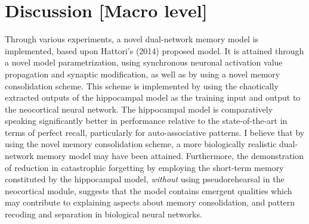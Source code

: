 
\chapter{Discussion [Macro level]}\label{chpt:discussion}


Through various experiments, a novel dual-network memory model is implemented, based upon Hattori's (2014) proposed model. It is attained through a novel model parametrization, using synchronous neuronal activation value propagation and synaptic modification, as well as by using a novel memory consolidation scheme. This scheme is implemented by using the chaotically extracted outputs of the hippocampal model as the training input and output to the neocortical neural network. The hippocampal model is comparatively speaking significantly better in performance relative to the state-of-the-art in terms of perfect recall, particularly for auto-associative patterns. I believe that by using the novel memory consolidation scheme, a more biologically realistic dual-network memory model may have been attained. Furthermore, the demonstration of reduction in catastrophic forgetting by employing the short-term memory constituted by the hippocampal model, \textit{without} using pseudorehearsal in the neocortical module, suggests that the model contains emergent qualities which may contribute to explaining aspects about memory consolidation, and pattern recoding and separation in biological neural networks.
\\



